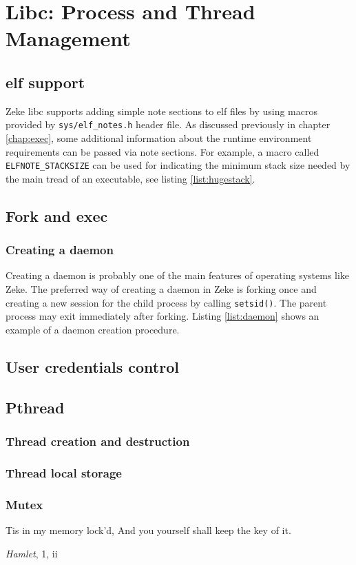 \chapter{Libc: Process and Thread Management}

\section{\acs{elf} support}\label{sec:libc_elf}

Zeke libc supports adding simple note sections to \acs{elf} files by using
macros provided by \verb+sys/elf_notes.h+ header file. As discussed
previously in chapter \ref{chap:exec}, some additional information about the
runtime environment requirements can be passed via note sections. For example,
a macro called \verb+ELFNOTE_STACKSIZE+ can be used for indicating the minimum
stack size needed by the main tread of an executable, see listing
\ref{list:hugestack}.



\section{Fork and exec}

\subsection{Creating a daemon}

Creating a daemon is probably one of the main features of operating systems
like Zeke. The preferred way of creating a daemon in Zeke is forking once and
creating a new session for the child process by calling \verb+setsid()+. The
parent process may exit immediately after forking. Listing \ref{list:daemon}
shows an example of a daemon creation procedure.



\section{User credentials control}

\section{Pthread}

\subsection{Thread creation and destruction}

\subsection{Thread local storage}

\subsection{Mutex}

\epigraph{Tis in my memory lock'd,\newline
          And you yourself shall keep the key of it.}{\textit{Hamlet}, 1, ii}

